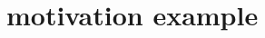 \documentclass[conference]{IEEEtran}
\begin{document}
 
%
\section{motivation example }
\end{document}
